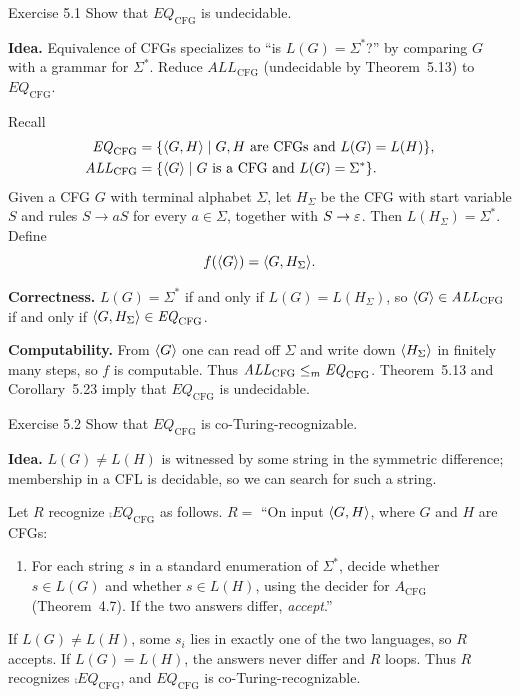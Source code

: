 \begin{question}{Exercise 5.1}
Show that $\mathit{EQ}_{\mathrm{CFG}}$ is undecidable.
\end{question}
\begin{soln}
\textbf{Idea.} Equivalence of CFGs specializes to ``is $L(G)=\Sigma^*$?'' by comparing $G$ with a grammar for $\Sigma^*$. Reduce $\mathit{ALL}_{\mathrm{CFG}}$ (undecidable by Theorem~5.13) to $\mathit{EQ}_{\mathrm{CFG}}$.

Recall
\begin{align*}
\mathit{EQ}_{\mathrm{CFG}}
&=\{\langle G,H\rangle\mid \text{$G,H$ are CFGs and $L(G)=L(H)$}\},\\
\mathit{ALL}_{\mathrm{CFG}}
&=\{\langle G\rangle\mid \text{$G$ is a CFG and $L(G)=\Sigma^*$}\}.
\end{align*}
Given a CFG $G$ with terminal alphabet $\Sigma$, let $H_\Sigma$ be the CFG with start variable $S$ and rules
$S\to aS$ for every $a\in\Sigma$, together with $S\to\varepsilon$. Then $L(H_\Sigma)=\Sigma^*$. Define
\[
f(\langle G\rangle)=\langle G,H_\Sigma\rangle.
\]

\textbf{Correctness.}
$L(G)=\Sigma^*$ if and only if $L(G)=L(H_\Sigma)$, so
$\langle G\rangle\in\mathit{ALL}_{\mathrm{CFG}}$ if and only if $\langle G,H_\Sigma\rangle\in\mathit{EQ}_{\mathrm{CFG}}$.

\textbf{Computability.} From $\langle G\rangle$ one can read off $\Sigma$ and write down $\langle H_\Sigma\rangle$ in finitely many steps, so $f$ is computable. Thus $\mathit{ALL}_{\mathrm{CFG}}\le_{m}\mathit{EQ}_{\mathrm{CFG}}$. Theorem~5.13 and Corollary~5.23 imply that $\mathit{EQ}_{\mathrm{CFG}}$ is undecidable.
\end{soln}

\begin{question}{Exercise 5.2}
Show that $\mathit{EQ}_{\mathrm{CFG}}$ is co-Turing-recognizable.
\end{question}
\begin{soln}
\textbf{Idea.} $L(G)\ne L(H)$ is witnessed by some string in the symmetric difference; membership in a CFL is decidable, so we can search for such a string.

Let $R$ recognize $\comp{\mathit{EQ}_{\mathrm{CFG}}}$ as follows.
$R=$ ``On input $\langle G,H\rangle$, where $G$ and $H$ are CFGs:
\begin{enumerate}
\item For each string $s$ in a standard enumeration of $\Sigma^*$, decide whether $s\in L(G)$ and whether $s\in L(H)$, using the decider for $A_{\mathrm{CFG}}$ (Theorem~4.7). If the two answers differ, \emph{accept}.''
\end{enumerate}

If $L(G)\ne L(H)$, some $s_i$ lies in exactly one of the two languages, so $R$ accepts. If $L(G)=L(H)$, the answers never differ and $R$ loops. Thus $R$ recognizes $\comp{\mathit{EQ}_{\mathrm{CFG}}}$, and $\mathit{EQ}_{\mathrm{CFG}}$ is co-Turing-recognizable.
\end{soln}

